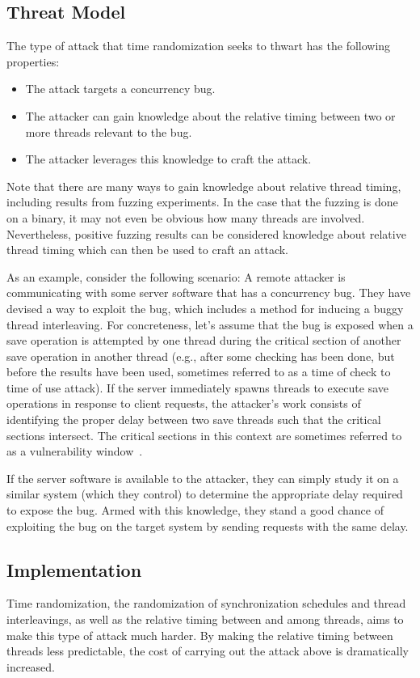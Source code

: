 \subsection{Threat Model}\label{threat-model}
The type of attack that time randomization seeks to thwart has the following properties:
\begin{itemize}
	\item The attack targets a concurrency bug.
	\item The attacker can gain knowledge about the relative timing between two
  or more threads relevant to the bug.
	\item The attacker leverages this knowledge to craft the attack.
\end{itemize}
Note that there are many ways to gain knowledge about relative thread timing, including results from fuzzing experiments.
In the case that the fuzzing is done on a binary, it may not even be obvious how many threads are involved.
Nevertheless, positive fuzzing results can be considered knowledge about relative thread timing which can then be used to craft an attack.

As an example, consider the following scenario:
A remote attacker is communicating with some server software
that has a concurrency bug.
They have devised a way to exploit the bug, which includes a method for inducing a buggy thread interleaving.
For concreteness, let's assume that the bug is exposed when a save operation
is attempted by one thread during the critical section of another save
operation in another thread (e.g., after some checking has been done, but before the results have been used, sometimes referred to as a time of check to time of use attack).
If the server immediately spawns threads to execute save operations in response to client requests, the attacker's work consists of identifying the proper delay between two save threads such that the critical sections intersect.
The critical sections in this context are sometimes referred to as a vulnerability window~\cite{Yang2012}.

If the server software is available to the attacker, they can simply study it on a similar system (which they control) to determine the appropriate delay required to expose the bug.
Armed with this knowledge, they stand a good chance of exploiting the bug on the target system by sending requests with the same delay.
\subsection{Implementation}\label{implementation}
Time randomization, the randomization of synchronization schedules and thread interleavings, as well as the relative timing between and among threads, aims to make this type of attack much harder.
By making the relative timing between threads less predictable, the cost of carrying out the attack above is dramatically increased.

